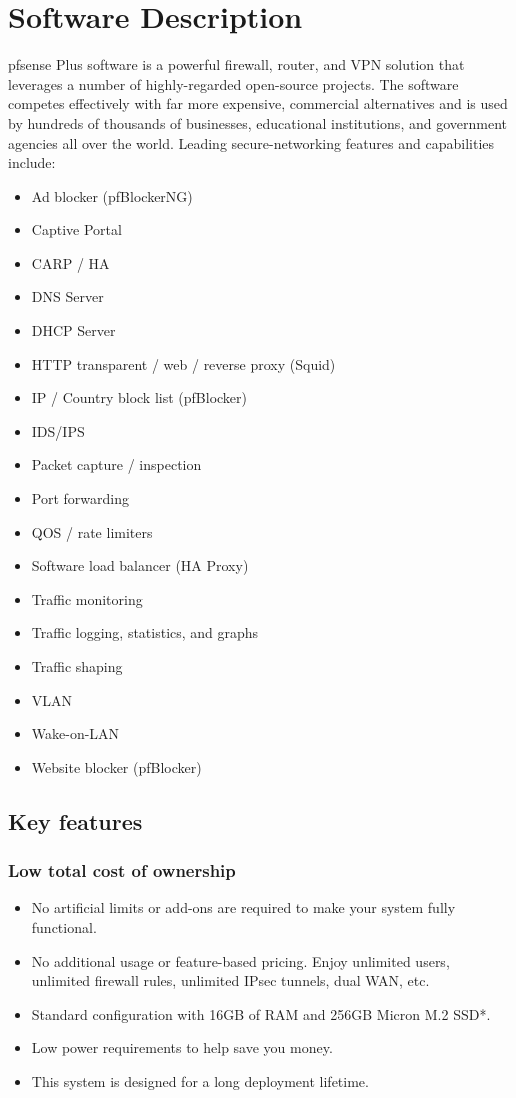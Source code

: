 \section{Software Description}

pfsense Plus software is a powerful firewall, router, and VPN solution that leverages a number of highly-regarded open-source projects. The software competes effectively with far more expensive, commercial alternatives and is used by hundreds of thousands of businesses, educational institutions, and government agencies all over the world. Leading secure-networking features and capabilities include:

\begin{itemize}
    \item Ad blocker (pfBlockerNG)
    \item Captive Portal
    \item CARP / HA
    \item DNS Server
    \item DHCP Server
    \item HTTP transparent / web / reverse proxy (Squid)
    \item IP / Country block list (pfBlocker)
    \item IDS/IPS
    \item Packet capture / inspection
    \item Port forwarding
    \item QOS / rate limiters
    \item Software load balancer (HA Proxy)
    \item Traffic monitoring
    \item Traffic logging, statistics, and graphs
    \item Traffic shaping
    \item VLAN
    \item Wake-on-LAN
    \item Website blocker (pfBlocker)
\end{itemize}

\subsection{Key features}

\subsubsection{Low total cost of ownership}

\begin{itemize}
    \item No artificial limits or add-ons are required to make your system fully functional.
    \item No additional usage or feature-based pricing. Enjoy unlimited users, unlimited firewall rules, unlimited IPsec tunnels, dual WAN, etc.
    \item Standard configuration with 16GB of RAM and 256GB Micron M.2 SSD*.
    \item Low power requirements to help save you money.
    \item This system is designed for a long deployment lifetime.
\end{itemize}

